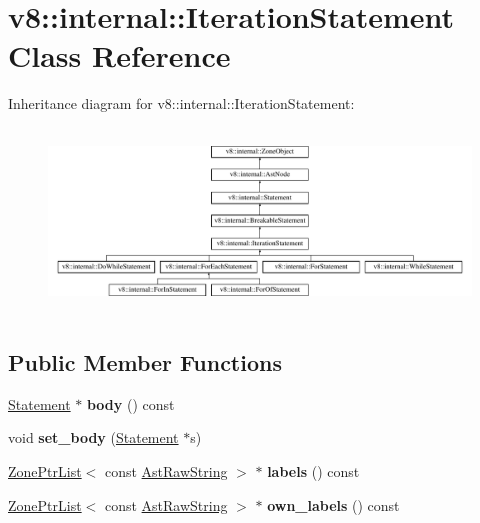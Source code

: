 \hypertarget{classv8_1_1internal_1_1IterationStatement}{}\section{v8\+:\+:internal\+:\+:Iteration\+Statement Class Reference}
\label{classv8_1_1internal_1_1IterationStatement}
Inheritance diagram for v8\+:\+:internal\+:\+:Iteration\+Statement\+:\begin{figure}[H]
\begin{center}
\leavevmode
\includegraphics[height=4.924623cm]{classv8_1_1internal_1_1IterationStatement}
\end{center}
\end{figure}
\subsection*{Public Member Functions}
\begin{DoxyCompactItemize}
\item 
\mbox{\label{classv8_1_1internal_1_1IterationStatement_ad71d741d348a1cf51f06d14dca30a536}} 
\mbox{\hyperlink{classv8_1_1internal_1_1Statement}{Statement}} $\ast$ {\bfseries body} () const
\item 
\mbox{\label{classv8_1_1internal_1_1IterationStatement_aa0bab603b217ff6d5cf3da4986d320fa}} 
void {\bfseries set\+\_\+body} (\mbox{\hyperlink{classv8_1_1internal_1_1Statement}{Statement}} $\ast$s)
\item 
\mbox{\label{classv8_1_1internal_1_1IterationStatement_aaa5ccefe855fe6fefb66e6462fe7f79e}} 
\mbox{\hyperlink{classv8_1_1internal_1_1ZoneList}{Zone\+Ptr\+List}}$<$ const \mbox{\hyperlink{classv8_1_1internal_1_1AstRawString}{Ast\+Raw\+String}} $>$ $\ast$ {\bfseries labels} () const
\item 
\mbox{\label{classv8_1_1internal_1_1IterationStatement_a8b0c10e687b3a0ccf01b9ffaacd190ff}} 
\mbox{\hyperlink{classv8_1_1internal_1_1ZoneList}{Zone\+Ptr\+List}}$<$ const \mbox{\hyperlink{classv8_1_1internal_1_1AstRawString}{Ast\+Raw\+String}} $>$ $\ast$ {\bfseries own\+\_\+labels} () const
\end{DoxyCompactItemize}

